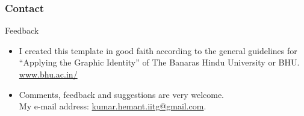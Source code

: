 \documentclass[]{beamer} %
\begin{document}
\begin{frame}[fragile]
\frametitle{Contact}
 \begin{block}{Feedback}
	\begin{itemize}
	\item I created this template in good faith according
	to the general guidelines for ``Applying the Graphic
	Identity'' of The Banaras Hindu University or  BHU.\\	
\url{www.bhu.ac.in/}
	\item Comments, feedback and suggestions are very welcome.\\
	My e-mail address:
	\href{mailto:kumar.hemant.iitg@gmail.com}{kumar.hemant.iitg@gmail.com}.
	\end{itemize}
 \end{block}
\end{frame}
\end{document}
